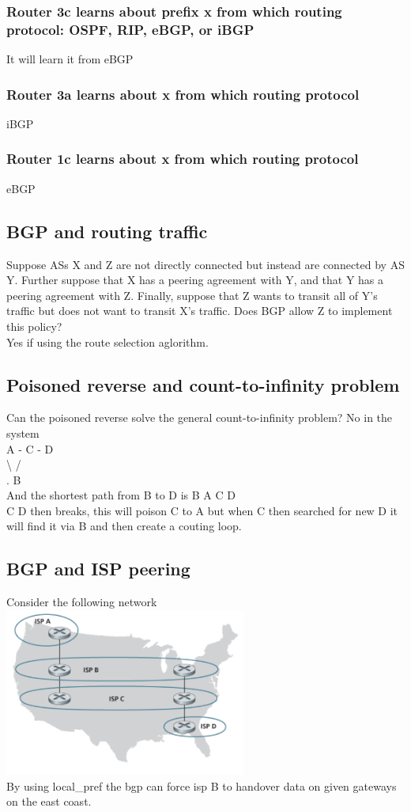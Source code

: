 \documentclass[12pt, a4paper]{article}
\begin{document}
			\subsubsection{Router 3c learns about prefix x from which routing protocol: OSPF, RIP, eBGP, or iBGP}
				It will learn it from eBGP
			\subsubsection{Router 3a learns about x from which routing protocol}
				iBGP
			\subsubsection{Router 1c learns about x from which routing protocol}
				eBGP
		\subsection{BGP and routing traffic}
			Suppose ASs X and Z are not directly connected but instead are connected by AS Y. Further suppose that X has a peering agreement with Y, and that Y has a peering agreement with Z. Finally, suppose that Z wants to transit all of Y’s traffic but does not want to transit X’s traffic. Does BGP allow Z to implement this policy?\\
			Yes if using the route selection aglorithm.
		\subsection{Poisoned reverse and count-to-infinity problem}
			Can the poisoned reverse solve the general count-to-infinity problem?
			No in the system\\
			A - C - D\\
			\;\textbackslash\;\; / \\
			. B\\
			And the shortest path from B to D is B A C D\\
			C D then breaks, this will poison C to A but when C then searched for new D it will find it via B and then create a couting loop.
		\subsection{BGP and ISP peering}
			Consider the following network\\
			\includegraphics[width=300px]{assets/9.5.png}\\
			By using local\_pref the bgp can force isp B to handover data on given gateways on the east coast.
			
\end{document}
